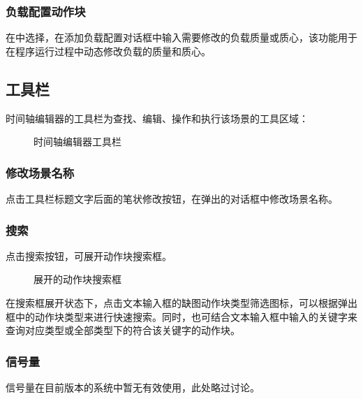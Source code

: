 
\subsubsection{负载配置动作块}
在中选择，在添加负载配置对话框中输入需要修改的负载质量或质心，该功能用于在程序运行过程中动态修改负载的质量和质心。



\subsection{工具栏}
时间轴编辑器的工具栏为查找、编辑、操作和执行该场景的工具区域：

\begin{figure}[ht]
	\centering
	\color{red}{缺图}
	\caption{时间轴编辑器工具栏}
	\label{fig:时间轴编辑器工具栏}
\end{figure}

\subsubsection{修改场景名称}
点击工具栏标题文字后面的笔状修改按钮，在弹出的对话框中修改场景名称。
\subsubsection{搜索}
点击搜索按钮，可展开动作块搜索框。

\begin{figure}[ht]
	\centering
	\color{red}{缺图}
	\caption{展开的动作块搜索框}
	\label{fig:展开的动作块搜索框}
\end{figure}

在搜索框展开状态下，点击文本输入框的{\color{red}缺图}动作块类型筛选图标，可以根据弹出框中的动作块类型来进行快速搜索。同时，也可结合文本输入框中输入的关键字来查询对应类型或全部类型下的符合该关键字的动作块。
\subsubsection{信号量}
信号量在目前版本的\LM 系统中暂无有效使用，此处略过讨论。
